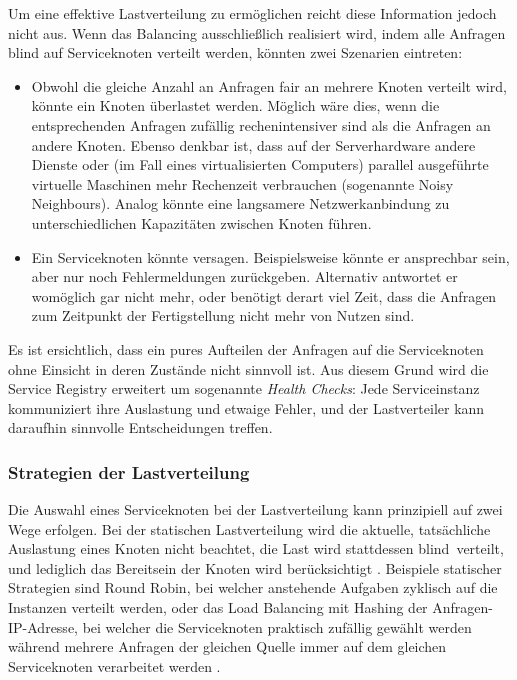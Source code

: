 Um eine effektive Lastverteilung zu ermöglichen reicht diese Information jedoch nicht aus. Wenn das Balancing ausschließlich realisiert wird, indem alle Anfragen \glq blind\grq{} auf Serviceknoten verteilt werden, könnten zwei Szenarien eintreten:
\begin{itemize}
	\item Obwohl die gleiche Anzahl an Anfragen fair an mehrere Knoten verteilt wird, könnte ein Knoten überlastet werden. Möglich wäre dies, wenn die entsprechenden Anfragen zufällig rechenintensiver sind als die Anfragen an andere Knoten. Ebenso denkbar ist, dass auf der Serverhardware andere Dienste oder (im Fall eines virtualisierten Computers) parallel ausgeführte virtuelle Maschinen mehr Rechenzeit verbrauchen (sogenannte \glqq Noisy Neighbours\grqq{}). Analog könnte eine langsamere Netzwerkanbindung zu unterschiedlichen Kapazitäten zwischen Knoten führen.
	\item Ein Serviceknoten könnte versagen. Beispielsweise könnte er ansprechbar sein, aber nur noch Fehlermeldungen zurückgeben. Alternativ antwortet er womöglich gar nicht mehr, oder benötigt derart viel Zeit, dass die Anfragen zum Zeitpunkt der Fertigstellung nicht mehr von Nutzen sind.
\end{itemize}

Es ist ersichtlich, dass ein pures Aufteilen der Anfragen auf die Serviceknoten ohne Einsicht in deren Zustände nicht sinnvoll ist. Aus diesem Grund wird die Service Registry erweitert um sogenannte \textit{Health Checks}: Jede Serviceinstanz kommuniziert ihre Auslastung und etwaige Fehler, und der Lastverteiler kann daraufhin sinnvolle Entscheidungen treffen.

\subsubsection{Strategien der Lastverteilung}\label{sec:loadbalancing-strats}
Die Auswahl eines Serviceknoten bei der Lastverteilung kann prinzipiell auf zwei Wege erfolgen. Bei der statischen Lastverteilung wird die aktuelle, tatsächliche Auslastung eines Knoten nicht beachtet, die Last wird stattdessen \glq blind\grq\ verteilt, und lediglich das Bereitsein der Knoten wird berücksichtigt \cite{mishra.2020}. Beispiele statischer Strategien sind Round Robin, bei welcher anstehende Aufgaben zyklisch auf die Instanzen verteilt werden, oder das Load Balancing mit Hashing der Anfragen-IP-Adresse, bei welcher die Serviceknoten praktisch zufällig gewählt werden während mehrere Anfragen der gleichen Quelle immer auf dem gleichen Serviceknoten verarbeitet werden \cite{g4g-loadbalancing}.


